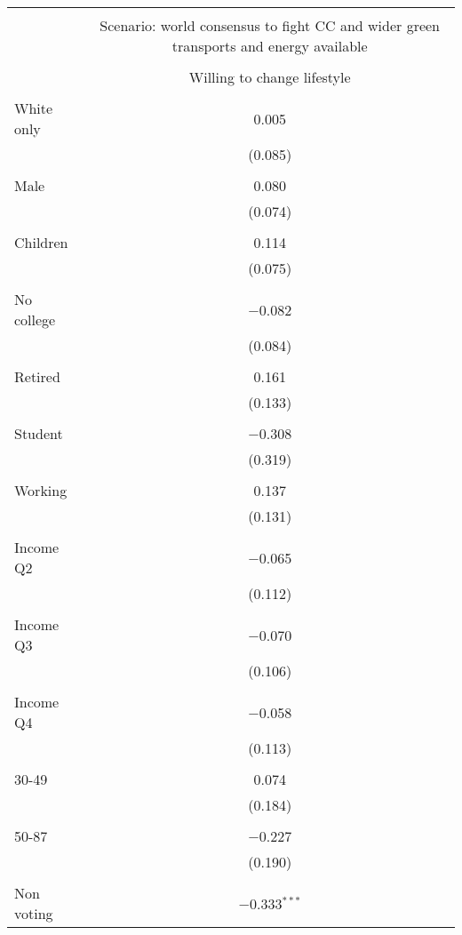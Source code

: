 
\begin{tabular}{@{\extracolsep{5pt}}lc} 
\\[-1.8ex]\hline 
\hline \\[-1.8ex] 
 & \multicolumn{1}{c}{Scenario: world consensus to fight CC and wider green transports and energy available} \\ 
\cline{2-2} 
\\[-1.8ex] & Willing to change lifestyle \\ 
\hline \\[-1.8ex] 
 White only & 0.005 \\ 
  & (0.085) \\ 
  & \\ 
 Male & 0.080 \\ 
  & (0.074) \\ 
  & \\ 
 Children & 0.114 \\ 
  & (0.075) \\ 
  & \\ 
 No college & $-$0.082 \\ 
  & (0.084) \\ 
  & \\ 
 Retired & 0.161 \\ 
  & (0.133) \\ 
  & \\ 
 Student & $-$0.308 \\ 
  & (0.319) \\ 
  & \\ 
 Working & 0.137 \\ 
  & (0.131) \\ 
  & \\ 
 Income Q2 & $-$0.065 \\ 
  & (0.112) \\ 
  & \\ 
 Income Q3 & $-$0.070 \\ 
  & (0.106) \\ 
  & \\ 
 Income Q4 & $-$0.058 \\ 
  & (0.113) \\ 
  & \\ 
 30-49 & 0.074 \\ 
  & (0.184) \\ 
  & \\ 
 50-87 & $-$0.227 \\ 
  & (0.190) \\ 
  & \\ 
 Non voting & $-$0.333$^{***}$ \\ 

\end{tabular}
